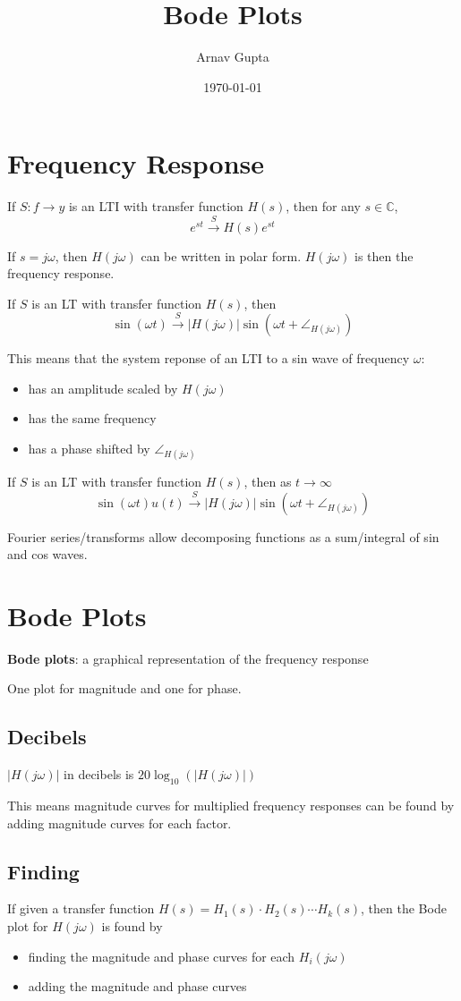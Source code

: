 \documentclass[11pt]{article}
\author{Arnav Gupta}
\date{\today}
\title{Bode Plots}
\begin{document}
\maketitle
\tableofcontents

\section{Frequency Response}
\label{sec:org1af78a1}
If \(S:f \to y\) is an LTI with transfer function \(H(s)\), then for any \(s \in \mathbb{C}\),
$$
e^{st} \xrightarrow{S} H(s) e^{st}
$$

If \(s = j\omega\), then \(H(j\omega)\) can be written in polar form.
\(H(j \omega)\) is then the frequency response.

If \(S\) is an LT with transfer function \(H(s)\), then
$$
\sin(\omega t) \xrightarrow{S} |H(j\omega)| \sin(\omega t + \angle_{H(j\omega)})
$$

This means that the system reponse of an LTI to a sin wave of frequency \(\omega\):
\begin{itemize}
\item has an amplitude scaled by \(H(j\omega)\)
\item has the same frequency
\item has a phase shifted by \(\angle_{H(j\omega)}\)
\end{itemize}

If \(S\) is an LT with transfer function \(H(s)\), then as \(t \to \infty\)
$$
\sin(\omega t)u(t) \xrightarrow{S} |H(j\omega)| \sin(\omega t + \angle_{H(j\omega)})
$$

Fourier series/transforms allow decomposing functions as a sum/integral of sin
and cos waves.
\section{Bode Plots}
\label{sec:orgbb0e82f}
\textbf{Bode plots}: a graphical representation of the frequency response

One plot for magnitude and one for phase.
\subsection{Decibels}
\label{sec:org5b5a24b}
\(|H(j\omega)|\) in decibels is \(20 \log_{10}(|H(j\omega)|)\)

This means magnitude curves for multiplied frequency responses can be found
by adding magnitude curves for each factor.
\subsection{Finding}
\label{sec:orga75cb35}
If given a transfer function \(H(s) = H_{1}(s) \cdot H_{2}(s) \cdots H_{k}(s)\), then
the Bode plot for \(H(j \omega)\) is found by
\begin{itemize}
\item finding the magnitude and phase curves for each \(H_{i}(j\omega)\)
\item adding the magnitude and phase curves
\end{itemize}
\end{document}
